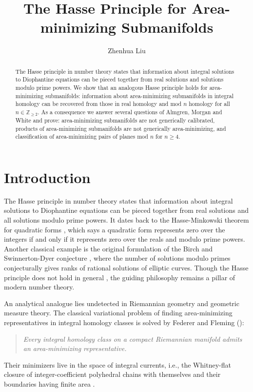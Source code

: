 \documentclass[11pt,a4paper]{amsart}
\title[The Hasse Principle for Area-minimizing Submanifolds]{The Hasse Principle for Area-minimizing Submanifolds}
\author{Zhenhua Liu}
\numberwithin{equation}{section}
\theoremstyle{plain}
\theoremstyle{definition}
\numberwithin{equation}{subsection}
\begin{document}
	\setlength{\abovedisplayskip}{5pt}
	\setlength{\belowdisplayskip}{5pt}
	\setlength{\abovedisplayshortskip}{5pt}
	\setlength{\belowdisplayshortskip}{5pt}
	\begin{abstract}
	The Hasse principle in number theory states that information about integral solutions to Diophantine equations can be pieced together from real solutions and solutions modulo prime powers. We show that an analogous Hasse principle holds for area-minimizing submanifolds: information about area-minimizing submanifolds in integral homology can be recovered from those in real homology and mod $n$ homology for all $n\in \mathbb{Z}_{\ge 2}$. As a consequence we answer several questions of Almgren, Morgan and White and prove: area-minimizing submanifolds are not generically calibrated, products of area-minimizing submanifolds are not generically area-minimizing, and classification of area-minimizing pairs of planes mod $n$ for $n\ge 4$. 
	\end{abstract}
	\maketitle\vspace{-3em}
	\section{Introduction}\label{hsintro}
	The Hasse principle \cite{HHhp,JSec} in number theory states that information about integral solutions to Diophantine equations can be pieced together from real solutions and all solutions modulo prime powers. It dates back to the Hasse-Minkowski theorem for quadratic forms \cite{JSca}, which says a quadratic form represents zero over the integers if and only if it represents zero over the reals and modulo prime powers. Another classical example is the original formulation of the Birch and Swinnerton-Dyer conjecture \cite{BSD}, where the  number of solutions modulo primes conjecturally gives ranks of rational solutions of elliptic curves. Though the Hasse principle does not hold in general \cite{EShp}, the guiding philosophy remains a pillar of modern number theory.
	
	An analytical analogue lies undetected in Riemannian geometry and geometric measure theory. The classical variational problem of finding area-minimizing representatives in integral homology classes is solved by Federer and Fleming (\cite{FF}):
	\begin{quote}
		\emph{Every integral homology class on a compact Riemannian manifold admits an area-minimizing representative.}
	\end{quote}
	Their minimizers live in the space of integral currents, i.e., the Whitney-flat closure of integer-coefficient polyhedral chains with themselves and their boundaries having finite area \cite{FF}.
	
\end{document}
